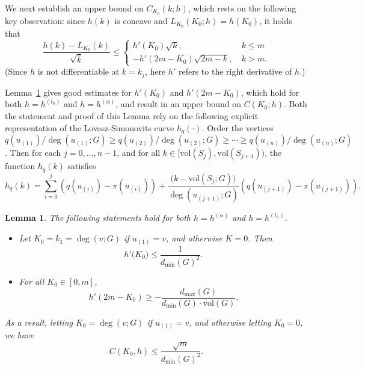 \documentclass{article}
\newcommand{\vol}{\mathrm{vol}}
\newcommand{\1}{\mathbf{1}}
\newtheorem{lemma}{Lemma}[section]
\theoremstyle{definition}
\theoremstyle{remark}
\begin{document}
We next establish an upper bound on $C_{K_0}(k;h)$, which rests on the following key observation: since $h(k)$ is concave and $L_{K_0}(K_0;h) = h(K_0)$, it holds that
\begin{equation}
\label{pf:linearization_bound_1}
\frac{h(k) - L_{K_0}(k)}{\sqrt{\overline{k}}} \leq
\begin{cases}
h'(K_0) \sqrt{k},~& k \leq m \\
-h'(2m - K_0) \sqrt{2m - k},~& k > m.
\end{cases}
\end{equation}
(Since $h$ is not differentiable at $k = k_j$, here $h'$ refers to the right derivative of $h$.)  

Lemma~\ref{lem:linearization_bound} gives good estimates for $h'(K_0)$ and $h'(2m - K_0)$, which hold for both $h = h^{(t_0)}$ and $h = h^{(\alpha)}$, and result in an upper bound on $C(K_0;h)$. Both the statement and proof of this Lemma rely on the following explicit representation of the Lovasz-Simonovits curve $h_q(\cdot)$. Order the vertices $q(u_{(1)})/\deg(u_{(1)};G) \geq q(u_{(2)})/\deg(u_{(2)};G) \geq \cdots \geq q(u_{(n)})/\deg(u_{(n)};G)$. Then for each $j = 0,\ldots,n - 1$, and for all $k \in [\vol(S_j),\vol(S_{j + 1}))$,  the function $h_q(k)$ satisfies
\begin{equation}
\label{eqn:lovasz_simonovits}
h_q(k) = \sum_{i = 0}^{j} \left(q(u_{(i)}) - \pi(u_{(i)})\right) + \frac{\bigl(k - \vol(S_j;G)\bigr)}{\deg(u_{(j + 1)};G)} \left(q(u_{(j+1)}) - \pi(u_{(j+1)})\right). 
\end{equation}
\begin{lemma}
	\label{lem:linearization_bound}
	The following statements hold for both $h = h^{(\alpha)}$ and $h = h^{(t_0)}$. 
	\begin{itemize}
		\item Let $K_0 = k_1 = \deg(v;G)$ if $u_{(1)} = v$, and otherwise $K = 0$. Then  
		\begin{equation}
		\label{eqn:right_derivative_1}
		h'\bigl(K_0\bigr) \leq \frac{1}{d_{\min}(G)^2}.
		\end{equation}
		\item For all $K_0 \in [0,m]$,
		\begin{equation}
		\label{eqn:right_derivative_2}
		h'(2m - K_0) \geq -\frac{d_{\max}(G)}{d_{\min}(G)\cdot \vol(G)}.
		\end{equation}
	\end{itemize}
	As a result, letting $K_0 = \deg(v;G)$ if $u_{(1)} = v$, and otherwise letting $K_0 = 0$, we have
	\begin{equation*}
	C(K_0,h) \leq \frac{\sqrt{m}}{d_{\min}(G)^2}.
	\end{equation*}
\end{lemma}
\end{document}
